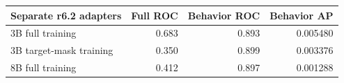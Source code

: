 \begin{tabular}{lrrr}
\toprule
Separate r6.2 adapters & Full ROC & Behavior ROC & Behavior AP \\
\midrule
3B full training & 0.683 & 0.893 & 0.005480 \\
3B target-mask training & 0.350 & 0.899 & 0.003376 \\
8B full training & 0.412 & 0.897 & 0.001288 \\
\bottomrule
\end{tabular}
